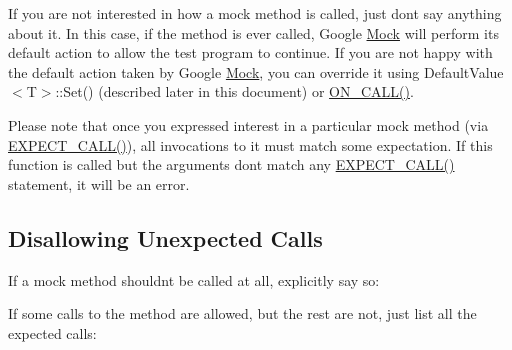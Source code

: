 If you are not interested in how a mock method is called, just don\textquotesingle{}t say anything about it. In this case, if the method is ever called, Google \mbox{\hyperlink{class_mock}{Mock}} will perform its default action to allow the test program to continue. If you are not happy with the default action taken by Google \mbox{\hyperlink{class_mock}{Mock}}, you can override it using {\ttfamily Default\+Value$<$T$>$\+::\+Set()} (described later in this document) or {\ttfamily \mbox{\hyperlink{googletest-master_2googlemock_2include_2gmock_2gmock-spec-builders_8h_a5b12ae6cf84f0a544ca811b380c37334}{O\+N\+\_\+\+C\+A\+L\+L()}}}.

Please note that once you expressed interest in a particular mock method (via {\ttfamily \mbox{\hyperlink{googletest-master_2googlemock_2include_2gmock_2gmock-spec-builders_8h_a535a6156de72c1a2e25a127e38ee5232}{E\+X\+P\+E\+C\+T\+\_\+\+C\+A\+L\+L()}}}), all invocations to it must match some expectation. If this function is called but the arguments don\textquotesingle{}t match any {\ttfamily \mbox{\hyperlink{googletest-master_2googlemock_2include_2gmock_2gmock-spec-builders_8h_a535a6156de72c1a2e25a127e38ee5232}{E\+X\+P\+E\+C\+T\+\_\+\+C\+A\+L\+L()}}} statement, it will be an error.

\subsection*{Disallowing Unexpected Calls}

If a mock method shouldn\textquotesingle{}t be called at all, explicitly say so\+:


\begin{DoxyCode}{0}
\end{DoxyCode}


If some calls to the method are allowed, but the rest are not, just list all the expected calls\+:


\begin{DoxyCode}{0}
\end{DoxyCode}


